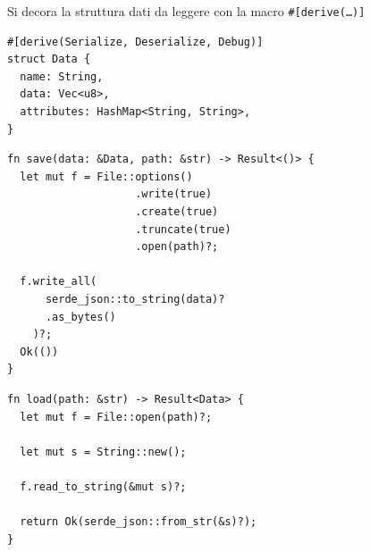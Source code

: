 Si decora la struttura dati da leggere con la macro \texttt{\#[derive(\dots)]}
\begin{verbatim}
#[derive(Serialize, Deserialize, Debug)]
struct Data {
  name: String,
  data: Vec<u8>,
  attributes: HashMap<String, String>,
}
\end{verbatim}

\begin{center}
  \begin{minipage}{0.5\linewidth}
    \begin{verbatim}
fn save(data: &Data, path: &str) -> Result<()> {
  let mut f = File::options()
                    .write(true)
                    .create(true)
                    .truncate(true)
                    .open(path)?;

  f.write_all(
      serde_json::to_string(data)?
      .as_bytes()
    )?;
  Ok(())
}
\end{verbatim}
  \end{minipage}%
  \hfill
  \begin{minipage}{0.45\linewidth}
    \begin{verbatim}
fn load(path: &str) -> Result<Data> {
  let mut f = File::open(path)?;
  
  let mut s = String::new();
  
  f.read_to_string(&mut s)?;
  
  return Ok(serde_json::from_str(&s)?);
}
\end{verbatim}
  \end{minipage}
\end{center}








